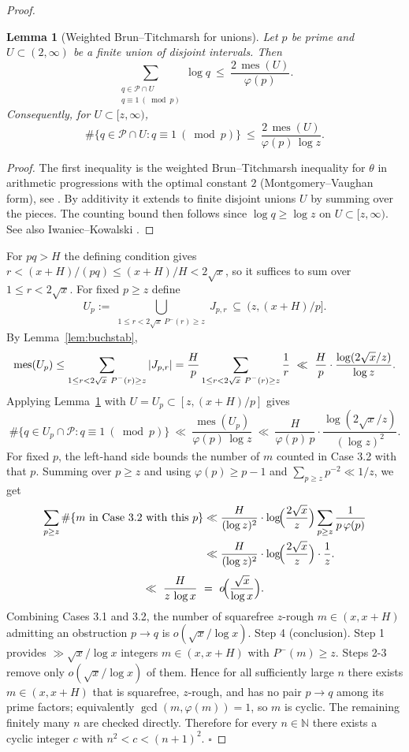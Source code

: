 \documentclass[12pt]{article}
\newtheorem{lemma}{Lemma}[theorem]
\theoremstyle{remark}
\begin{document}
\begin{proof}
\begin{lemma}[Weighted Brun--Titchmarsh for unions]\label{lem:bt-union}
Let $p$ be prime and $U\subset(2,\infty)$ be a finite union of disjoint intervals. Then
\[
\sum_{\substack{q\in\mathcal P\cap U\\ q\equiv1\ (\bmod p)}}\log q\ \le\ \frac{2\,\operatorname{mes}(U)}{\varphi(p)}.
\]
Consequently, for $U\subset[z,\infty)$,
\[
\#\{q\in\mathcal P\cap U: q\equiv1\ (\bmod p)\}\ \le\ \frac{2\,\operatorname{mes}(U)}{\varphi(p)\,\log z}.
\]
\end{lemma}
\begin{proof}
The first inequality is the weighted Brun--Titchmarsh inequality for $\theta$ in arithmetic progressions with the optimal constant $2$ (Montgomery--Vaughan form), see \cite[Th.~6.7]{MV2007}. By additivity it extends to finite disjoint unions $U$ by summing over the pieces. The counting bound then follows since $\log q\ge\log z$ on $U\subset[z,\infty)$. See also Iwaniec--Kowalski \cite[Th.~18.11]{IK2004}.
\end{proof}
For $pq>H$ the defining condition gives $r<(x+H)/(pq)\le (x+H)/H<2\sqrt x$, so it suffices to sum over $1\le r<2\sqrt x$. For fixed $p\ge z$ define
\[
U_p:=\bigcup_{\substack{1\le r<2\sqrt x\ P^-(r)\ge z}} J_{p,r} \ \subseteq\ (z, (x+H)/p].
\]
By Lemma~\ref{lem:buchstab},
\[
\operatorname{mes}(U_p)\le \sum_{\substack{1\le r<2\sqrt x\ P^-(r)\ge z}} |J_{p,r}|=\frac{H}{p}\sum_{\substack{1\le r<2\sqrt x\ P^-(r)\ge z}}{1\over r}\ \ll\ \frac{H}{p}\cdot\frac{\log(2\sqrt x/z)}{\log z}.
\]
Applying Lemma~\ref{lem:bt-union} with $U=U_p\subset[z,(x+H)/p]$ gives
\[
\#\{q\in U_p\cap\mathcal P: q\equiv1\ (\bmod p)\}\ \ll\ \frac{\operatorname{mes}(U_p)}{\varphi(p)\,\log z}
\ \ll\ \frac{H}{\varphi(p)\,p}\cdot\frac{\log(2\sqrt x/z)}{(\log z)^2}.
\]
For fixed $p$, the left-hand side bounds the number of $m$ counted in Case 3.2 with that $p$. Summing over $p\ge z$ and using $\varphi(p)\ge p-1$ and $\sum_{p\ge z}p^{-2}\ll 1/z$, we get
\[
\begin{aligned}
\sum_{p\ge z}\#\{m\text{ in Case 3.2 with this }p\} &\ll \frac{H}{(\log z)^2}\cdot\log\!\Bigl(\frac{2\sqrt x}{z}\Bigr)\sum_{p\ge z}\frac{1}{p\,\varphi(p)}\\
&\ll \frac{H}{(\log z)^2}\cdot\log\!\Bigl(\frac{2\sqrt x}{z}\Bigr)\cdot\frac{1}{z}.
\end{aligned}
\]
\[
\ll\ \frac{H}{z\,\log x}\ =\ o\!\Bigl(\frac{\sqrt x}{\log x}\Bigr).
\]
Combining Cases 3.1 and 3.2, the number of squarefree $z$-rough $m\in(x,x+H)$ admitting an obstruction $p\to q$ is $o(\sqrt x/\log x)$.
Step 4 (conclusion). Step 1 provides $\gg \sqrt x/\log x$ integers $m\in(x,x+H)$ with $P^-(m)\ge z$. Steps 2-3 remove only $o(\sqrt x/\log x)$ of them. Hence for all sufficiently large $n$ there exists $m\in(x,x+H)$ that is squarefree, $z$-rough, and has no pair $p\to q$ among its prime factors; equivalently $\gcd(m,\varphi(m))=1$, so $m$ is cyclic. The remaining finitely many $n$ are checked directly. Therefore for every $n\in\mathbb N$ there exists a cyclic integer $c$ with $n^2<c<(n+1)^2$. $\square$
\end{proof}
\end{document}

